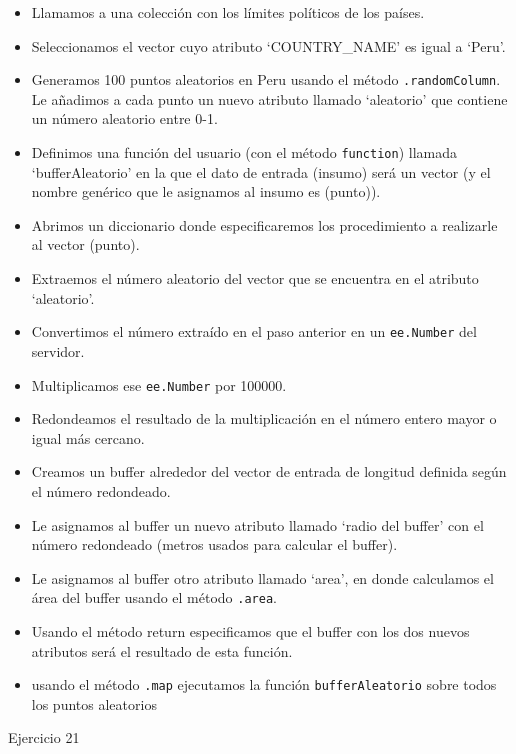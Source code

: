 \documentclass[
  12pt,
  letterpaper,
  twoside]{book}
\providecommand{\tightlist}{%
  \setlength{\itemsep}{0pt}\setlength{\parskip}{0pt}}
\begin{document}
\begin{itemize}
\tightlist
\item
  Llamamos a una colección con los límites políticos de los países.
\item
  Seleccionamos el vector cuyo atributo `COUNTRY\_NAME' es igual a `Peru'.
\item
  Generamos 100 puntos aleatorios en Peru usando el método \texttt{.randomColumn}. Le añadimos a cada punto un nuevo atributo llamado `aleatorio' que contiene un número aleatorio entre 0-1.
\item
  Definimos una función del usuario (con el método \texttt{function}) llamada `bufferAleatorio' en la que el dato de entrada (insumo) será un vector (y el nombre genérico que le asignamos al insumo es (punto)).
\item
  Abrimos un diccionario donde especificaremos los procedimiento a realizarle al vector (punto).
\item
  Extraemos el número aleatorio del vector que se encuentra en el atributo `aleatorio'.
\item
  Convertimos el número extraído en el paso anterior en un \texttt{ee.Number} del servidor.
\item
  Multiplicamos ese \texttt{ee.Number} por 100000.
\item
  Redondeamos el resultado de la multiplicación en el número entero mayor o igual más cercano.
\item
  Creamos un buffer alrededor del vector de entrada de longitud definida según el número redondeado.
\item
  Le asignamos al buffer un nuevo atributo llamado `radio del buffer' con el número redondeado (metros usados para calcular el buffer).
\item
  Le asignamos al buffer otro atributo llamado `area', en donde calculamos el área del buffer usando el método \texttt{.area}.
\item
  Usando el método return especificamos que el buffer con los dos nuevos atributos será el resultado de esta función.
\item
  usando el método \texttt{.map} ejecutamos la función \texttt{bufferAleatorio} sobre todos los puntos aleatorios
\end{itemize}

Ejercicio 21
\end{document}
